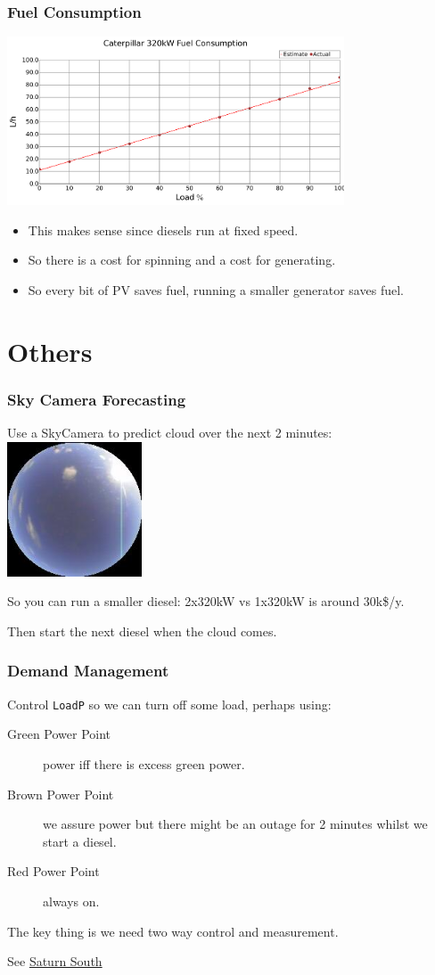\documentclass{beamer}
\begin{document}
\begin{frame}\frametitle{Fuel Consumption}
\includegraphics[width=10cm]{limits/figFuelCurve2.pdf}
\pause

\begin{itemize}
\item This makes sense since diesels run at fixed speed.
\pause
\item So there is a cost for spinning and a cost for generating.
\pause
\item So every bit of PV saves fuel, running a smaller generator
  saves fuel.
\end{itemize}
\end{frame}

\section{Others}
\begin{frame}\frametitle{Sky Camera Forecasting}
Use a SkyCamera to predict cloud over the next 2 minutes:
\pause
\includegraphics[width=4cm]{batch-2014-07-28T165557+0930-basis.jpg}
\pause

So you can run a smaller diesel: 2x320kW vs 1x320kW is around 30k\$/y.
\pause

Then start the next diesel when the cloud comes.
\end{frame}

\begin{frame}\frametitle{Demand Management}
Control \texttt{LoadP} so we can turn off some load, perhaps using:

\begin{description}
\item[Green Power Point] power iff there is excess green power.
\item[Brown Power Point] we assure power but there might be an outage
  for 2 minutes whilst we start a diesel.
\item[Red Power Point] always on.
\end{description}

The key thing is we need two way control and measurement.

See \href{http://www.saturnsouth.com}{Saturn South}
\end{frame}
\end{document}
